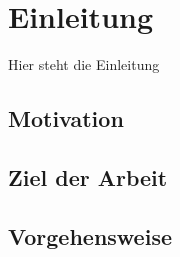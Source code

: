 
\chapter{Einleitung}
\label{sec:introduction}



Hier steht die Einleitung
\section{Motivation}
\label{sec:motivation}
\section{Ziel der Arbeit}
\label{sec:The aim of the work}
\section{Vorgehensweise}
\label{sec:method}
